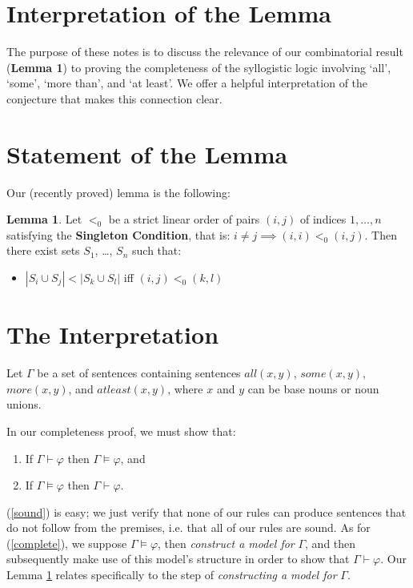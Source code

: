 \documentclass[12pt]{article}
\theoremstyle{definition}
\newtheorem{lemma}[theorem]{Lemma}
\begin{document}
\section{Interpretation of the Lemma}

The purpose of these notes is to discuss the relevance of our combinatorial result (\textbf{Lemma 1}) to proving the completeness of the syllogistic logic involving `all', `some', `more than', and `at least'.  We offer a helpful interpretation of the conjecture that makes this connection clear.

\section{Statement of the Lemma}

Our (recently proved) lemma is the following:

\begin{lemma}\label{Combinatorial-Lemma}
    Let $<_0$ be a strict linear order of pairs $(i, j)$ of indices $1, \ldots, n$ satisfying the \textbf{Singleton Condition}, that is: $i \ne j \implies (i, i) <_0 (i, j)$.  Then there exist sets $S_1$, \ldots, $S_n$ such that:
    
    \begin{itemize}
        \item $|S_i \cup S_j| < |S_k \cup S_l|$ iff $(i, j) <_0 (k, l)$
    \end{itemize}
\end{lemma}

\section{The Interpretation}

Let $\Gamma$ be a set of sentences containing sentences $all(x, y)$, $some(x, y)$, $more(x, y)$, and $atleast(x, y)$, where $x$ and $y$ can be base nouns or noun unions.

In our completeness proof, we must show that:
\begin{enumerate}
    \item \label{sound} If $\Gamma \vdash \varphi$ then $\Gamma \vDash \varphi$, and
    \item \label{complete} If $\Gamma \vDash \varphi$ then $\Gamma \vdash \varphi$.
\end{enumerate}

(\ref{sound}) is easy; we just verify that none of our rules can produce sentences that do not follow from the premises, i.e. that all of our rules are sound.  As for (\ref{complete}), we suppose $\Gamma \vDash \varphi$, then \textit{construct a model for} $\Gamma$, and then subsequently make use of this model's structure in order to show that $\Gamma \vdash \varphi$.  Our Lemma \ref{Combinatorial-Lemma} relates specifically to the step of \textit{constructing a model for} $\Gamma$.
\end{document}
